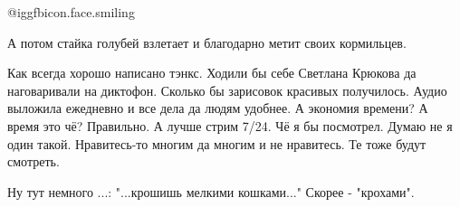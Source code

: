 \begin{itemize}
@igg{fbicon.face.smiling}

А потом стайка голубей взлетает и благодарно метит своих кормильцев.


Как всегда хорошо написано тэнкс. Ходили бы себе Светлана Крюкова да
наговаривали на диктофон. Сколько бы зарисовок красивых получилось. Аудио
выложила ежедневно и все дела да людям удобнее. А экономия времени? А время это
чё? Правильно. А лучше стрим 7/24. Чё я бы посмотрел. Думаю не я один такой.
Нравитесь-то многим да многим и не нравитесь. Те тоже будут смотреть.


Ну тут немного ...: "...крошишь мелкими кошками..." Скорее - "крохами".

\end{itemize} %
